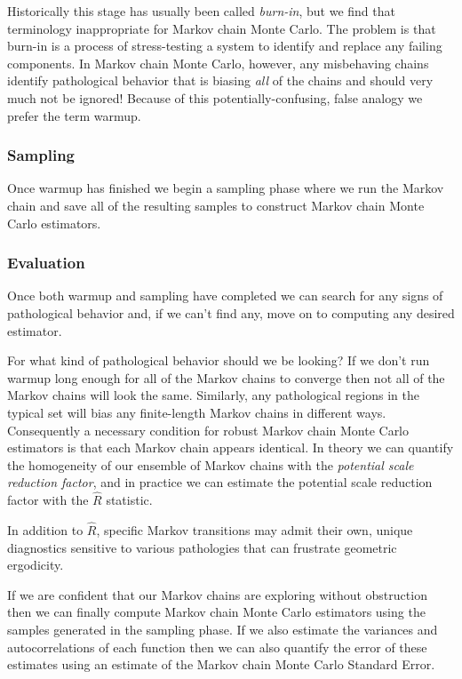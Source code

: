 Historically this stage has usually been called \emph{burn-in},
but we find that terminology inappropriate for Markov chain
Monte Carlo.  The problem is that burn-in is a process of 
stress-testing a system to identify and replace any failing
components.  In Markov chain Monte Carlo, however, any
misbehaving chains identify pathological behavior that is
biasing \emph{all} of the chains and should very much not 
be ignored!  Because of this potentially-confusing, false 
analogy we prefer the term warmup.

\subsubsection{Sampling}

Once warmup has finished we begin a sampling phase where
we run the Markov chain and save all of the resulting samples
to construct Markov chain Monte Carlo estimators.

\subsubsection{Evaluation}

Once both warmup and sampling have completed we can
search for any signs of pathological behavior and, if we
can't find any, move on to computing any desired estimator.

For what kind of pathological behavior should we be looking?
If we don't run warmup long enough for all of the Markov
chains to converge then not all of the Markov chains will look 
the same.  Similarly, any pathological regions in the typical set 
will bias any finite-length Markov chains in different ways.  
Consequently a necessary condition for robust Markov chain 
Monte Carlo estimators is that each Markov chain appears 
identical.  In theory we can quantify the homogeneity of our 
ensemble of Markov chains with the \emph{potential scale 
reduction factor}, and in practice we can estimate the potential 
scale reduction factor with the $\hat{R}$ statistic.

In addition to $\hat{R}$, specific Markov transitions may admit
their own, unique diagnostics sensitive to various pathologies
that can frustrate geometric ergodicity.

If we are confident that our Markov chains are exploring without
obstruction then we can finally compute Markov chain Monte
Carlo estimators using the samples generated in the sampling
phase.  If we also estimate the variances and autocorrelations
of each function then we can also quantify the error of these
estimates using an estimate of the Markov chain Monte Carlo
Standard Error.
